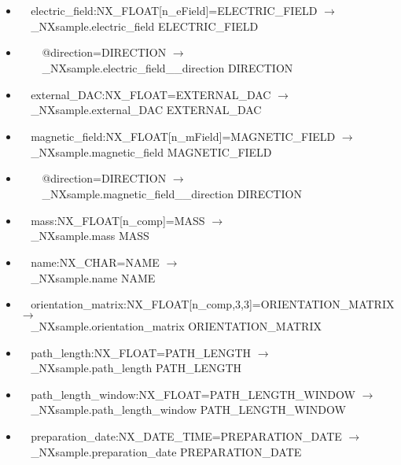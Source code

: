 \documentclass[11pt]{article}
\begin{document}
{{\begin{itemize}
\item{\verb|  |electric\_field:NX\_FLOAT[n\_eField]=ELECTRIC\_FIELD $\rightarrow$\\
\verb|  |\_NXsample.electric\_field ELECTRIC\_FIELD}

\item{\verb|    |@direction=DIRECTION $\rightarrow$\\
\verb|    |\_NXsample.electric\_field\_\_direction DIRECTION}

\item{\verb|  |external\_DAC:NX\_FLOAT=EXTERNAL\_DAC $\rightarrow$\\
\verb|  |\_NXsample.external\_DAC EXTERNAL\_DAC}

\item{\verb|  |magnetic\_field:NX\_FLOAT[n\_mField]=MAGNETIC\_FIELD $\rightarrow$\\
\verb|  |\_NXsample.magnetic\_field MAGNETIC\_FIELD}

\item{\verb|    |@direction=DIRECTION $\rightarrow$\\
\verb|    |\_NXsample.magnetic\_field\_\_direction DIRECTION}

\item{\verb|  |mass:NX\_FLOAT[n\_comp]=MASS $\rightarrow$\\
\verb|  |\_NXsample.mass MASS}

\item{\verb|  |name:NX\_CHAR=NAME $\rightarrow$\\
\verb|  |\_NXsample.name NAME}

\item{\verb|  |orientation\_matrix:NX\_FLOAT[n\_comp,3,3]=ORIENTATION\_MATRIX $\rightarrow$\\
\verb|  |\_NXsample.orientation\_matrix ORIENTATION\_MATRIX}

\item{\verb|  |path\_length:NX\_FLOAT=PATH\_LENGTH $\rightarrow$\\
\verb|  |\_NXsample.path\_length PATH\_LENGTH}

\item{\verb|  |path\_length\_window:NX\_FLOAT=PATH\_LENGTH\_WINDOW $\rightarrow$\\
\verb|  |\_NXsample.path\_length\_window PATH\_LENGTH\_WINDOW}

\item{\verb|  |preparation\_date:NX\_DATE\_TIME=PREPARATION\_DATE $\rightarrow$\\
\verb|  |\_NXsample.preparation\_date PREPARATION\_DATE}


\end{itemize}}}
\end{document}
